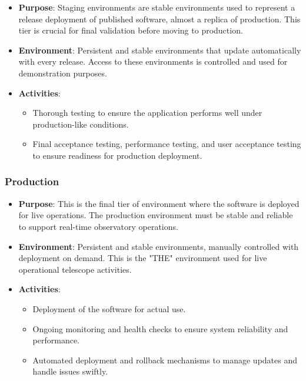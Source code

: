 \documentclass[a4paper]{spie}  %
\begin{document}
\begin{itemize}
    \item \textbf{Purpose}: Staging environments are stable environments used to represent a release deployment of published software, almost a replica of production. This tier is crucial for final validation before moving to production.
    \item \textbf{Environment}: Persistent and stable environments that update automatically with every release. Access to these environments is controlled and used for demonstration purposes.
    \item \textbf{Activities}:
    \begin{itemize}
        \item Thorough testing to ensure the application performs well under production-like conditions.
        \item Final acceptance testing, performance testing, and user acceptance testing to ensure readiness for production deployment.
    \end{itemize}
\end{itemize}

\subsubsection*{Production}

\begin{itemize}
    \item \textbf{Purpose}: This is the final tier of environment where the software is deployed for live operations. The production environment must be stable and reliable to support real-time observatory operations.
    \item \textbf{Environment}: Persistent and stable environments, manually controlled with deployment on demand. This is the "THE" environment used for live operational telescope activities.
    \item \textbf{Activities}:
    \begin{itemize}
        \item Deployment of the software for actual use.
        \item Ongoing monitoring and health checks to ensure system reliability and performance.
        \item Automated deployment and rollback mechanisms to manage updates and handle issues swiftly.
    \end{itemize}
\end{itemize}
\end{document}
